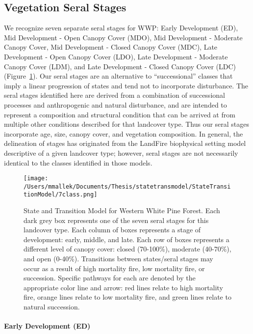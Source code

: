 \subsection*{Vegetation Seral Stages}
We recognize seven separate seral stages for WWP: Early Development (ED), Mid Development - Open Canopy Cover (MDO), Mid Development - Moderate Canopy Cover, Mid Development - Closed Canopy Cover (MDC), Late Development - Open Canopy Cover (LDO), Late Development - Moderate Canopy Cover (LDM), and Late Development - Closed Canopy Cover (LDC) (Figure~\ref{transmodel_wwp}). Our seral stages are an alternative to ``successional'' classes that imply a linear progression of states and tend not to incorporate disturbance. The seral stages identified here are derived from a combination of successional processes and anthropogenic and natural disturbance, and are intended to represent a composition and structural condition that can be arrived at from multiple other conditions described for that landcover type. Thus our seral stages incorporate age, size, canopy cover, and vegetation composition. In general, the delineation of stages has originated from the LandFire biophysical setting model descriptive of a given landcover type; however, seral stages are not necessarily identical to the classes identified in those models.


\begin{figure}[hbp]
\centering
\texttt{[image: /Users/mmallek/Documents/Thesis/statetransmodel/StateTransitionModel/7class.png]}
\caption{State and Transition Model for Western White Pine Forest. Each dark grey box represents one of the seven seral stages for this landcover type. Each column of boxes represents a stage of development: early, middle, and late. Each row of boxes represents a different level of canopy cover: closed (70-100\%), moderate (40-70\%), and open (0-40\%). Transitions between states/seral stages may occur as a result of high mortality fire, low mortality fire, or succession. Specific pathways for each are denoted by the appropriate color line and arrow: red lines relate to high mortality fire, orange lines relate to low mortality fire, and green lines relate to natural succession.} 
\label{transmodel_wwp}
\end{figure}

\paragraph*{Early Development (ED)}

